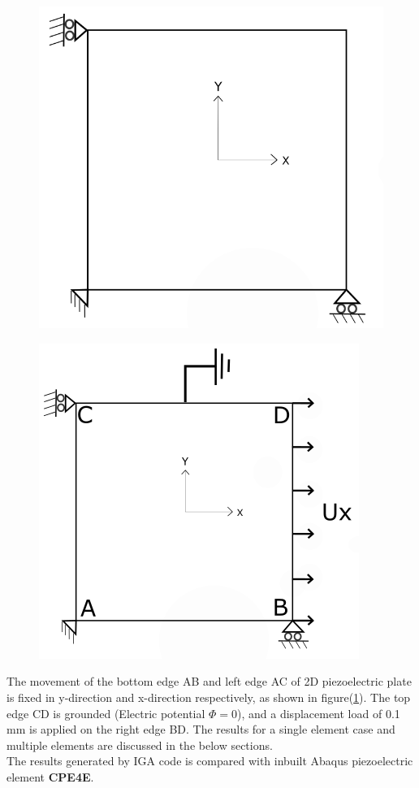 \documentclass[11pt]{article}
\begin{document}
\begin{figure}[H]
	\centering
	\begin{minipage}{.5\textwidth}
		\centering
		\includegraphics[width=0.8\linewidth]{2DPlate.png}
		\label{2Dplate}
	\end{minipage}%
	\begin{minipage}{.5\textwidth}
		\centering
		\includegraphics[width=1\linewidth]{Grounded.png}
		\label{EMLoading}
	\end{minipage}
\end{figure}
The movement of the bottom edge AB and left edge AC of 2D piezoelectric plate is fixed in y-direction and x-direction respectively, as shown in figure(\ref{EMLoading}).
The top edge CD is grounded (Electric potential $\Phi = 0$), and a displacement load of 0.1 mm is applied on the right edge BD. The results for a single element case and multiple elements are discussed in the below
sections. \\
The results generated by IGA code is compared with inbuilt Abaqus piezoelectric
element \textbf{CPE4E}.
\end{document}
